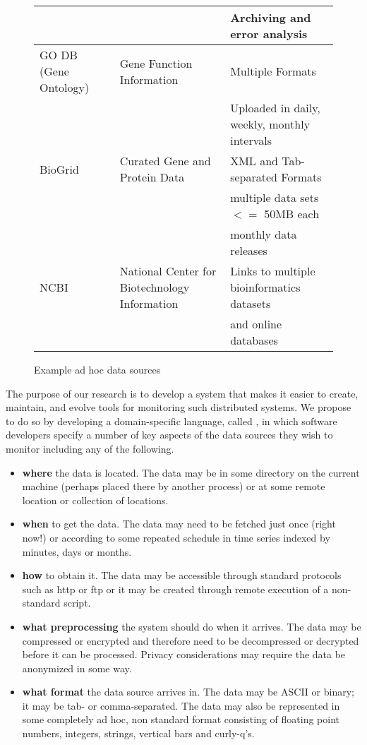\begin{figure*}
\begin{center}
\begin{tabular}{|l|l|l|}
                 &                          & Archiving and error analysis\\\hline
GO DB (Gene Ontology)~\cite{geneontology} & Gene Function Information & Multiple Formats \\
                                             && Uploaded in daily, weekly, monthly intervals \\\hline
BioGrid~\cite{biogrid} & Curated Gene and Protein Data & XML and Tab-separated Formats \\
          & & multiple data sets $<=$ 50MB each \\
          & & monthly data releases \\\hline
NCBI~\cite{ncbi} & National Center for Biotechnology Information & Links to multiple bioinformatics datasets \\
                                                     && and online databases\\
\hline\hline
\end{tabular}
\end{center}
\caption{Example ad hoc data sources}
\label{fig:exampledata}
\end{figure*}

The purpose of our research is to develop a system that makes it
easier to create, maintain, and evolve tools for monitoring such
distributed systems.  We propose to do so by developing a
domain-specific language, called \padsd, in which software developers
specify a number of key aspects of the data sources they wish to
monitor including any of the following.

\begin{itemize}
\item {\bf where} the data is located.  The data may be in some directory
on the current machine (perhaps placed there by another process) or at some 
remote location or collection of locations.
\item {\bf when} to get the data.  The data may need to be fetched just 
once (right now!) or according to some repeated schedule in time series 
indexed by minutes, days or months.
\item {\bf how} to obtain it.  The data may be accessible through standard 
protocols such as http or ftp or it may be created through remote execution 
of a non-standard script. 
\item {\bf what preprocessing} the system should do when it arrives.  The 
data may be compressed or encrypted and therefore need to be decompressed 
or decrypted before it can be processed.  Privacy considerations may require 
the data be anonymized in some way.
\item {\bf what format} the data source arrives in.  The data may be ASCII 
or binary; it may be tab- or comma-separated.  The data may also be 
represented in some completely ad hoc, non standard format consisting of 
floating point numbers, integers, strings, vertical bars and curly-q's.  
\end{itemize}

